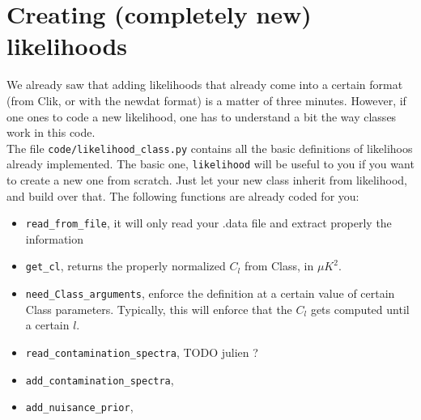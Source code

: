\documentclass[10pt]{article}
\begin{document}
\section{Creating (completely new) likelihoods}

  We already saw that adding likelihoods that already come into a certain format
  (from Clik, or with the newdat format) is a matter of three minutes. However,
  if one ones to code a new likelihood, one has to understand a bit the way
  classes work in this code.\\

  The file \verb?code/likelihood_class.py? contains all the basic definitions
  of likelihoos already implemented. The basic one, \verb?likelihood? will be
  useful to you if you want to create a new one from scratch. Just let your new
  class inherit from likelihood, and build over that. The following functions are already coded for you:\\

  \begin{itemize}
    \item \verb?read_from_file?, it will only read your .data file and extract
      properly the information
    \item \verb?get_cl?, returns the properly normalized $C_l$ from Class, in $\mu K^2$.
    \item \verb?need_Class_arguments?, enforce the definition at a certain
      value of certain Class parameters. Typically, this will enforce that the
      $C_l$ gets computed until a certain $l$.
    \item \verb?read_contamination_spectra?, TODO julien ?
    \item \verb?add_contamination_spectra?,
    \item \verb?add_nuisance_prior?,
  \end{itemize}
\end{document}
